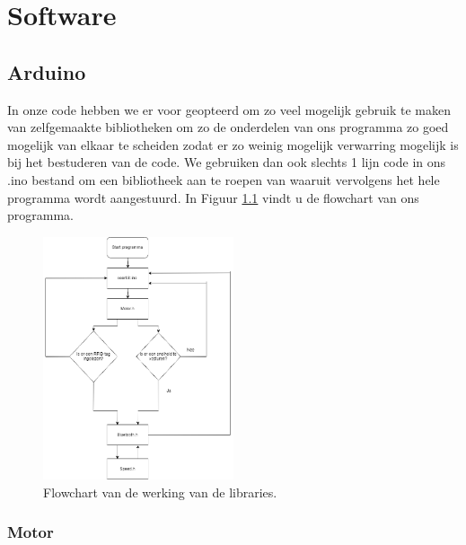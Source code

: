 
\chapter{Software}

\section{Arduino}

In onze code hebben we er voor geopteerd om zo veel mogelijk gebruik te maken van zelfgemaakte bibliotheken om zo de onderdelen van ons programma zo goed mogelijk van elkaar te scheiden zodat er zo weinig mogelijk verwarring mogelijk is bij het bestuderen van de code. We gebruiken dan ook slechts 1 lijn code in ons .ino bestand om een bibliotheek aan te roepen van waaruit vervolgens het hele programma wordt aangestuurd. In Figuur \ref{fig:flowchart} vindt u de flowchart van ons programma.

\begin{figure}[h]
\centering
\includegraphics[width=0.5\textwidth]{flowchartLibraries.png}
\caption{Flowchart van de werking van de libraries. \label{fig:flowchart}}
\end{figure}



\subsection{Motor}

